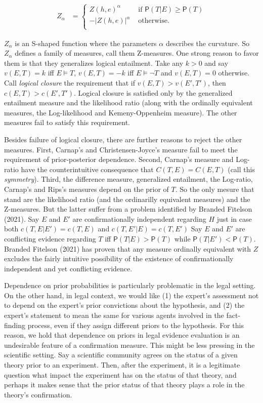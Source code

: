 \documentclass[
  10pt,
  dvipsnames,enabledeprecatedfontcommands]{scrartcl}
\newcommand{\n}{\neg}
\newcommand{\pr}[1]{\mathsf{P}(#1)}
\begin{document}
\begin{align*}
Z_{\alpha}  & =  \left\{ \begin{array}{lr} 
Z(h, e)^{\alpha} & \mbox{ if } \pr{T\vert E} \geq \pr{T}\\
- |Z(h, e)|^{\alpha} &\mbox { otherwise.}\\
\end{array} \right.
\end{align*}

\noindent \(Z_{\alpha}\) is an S-shaped function where the parameters
\(\alpha\) describes the curvature. So \(Z_{\alpha}\) defines a family
of measures, call them Z-measures. One strong reason to favor them is
that they generalizes logical entailment. Take any \(k > 0\) and say
\(v(E,T) =k\) iff \(E\models T\), \(v(E,T) = -k\) iff \(E \models \n T\)
and \(v(E,T)=0\) otherwise. Call \emph{logical closure} the requirement
that if \(v(E,T) > v(E', T')\), then \(c(E, T) > c(E' , T' )\). Logical
closure is satisfied only by the generalized entailment measure and the
likelihood ratio (along with the ordinally equivalent measures, the
Log-likelihood and Kemeny-Oppenheim measure). The other measures fail to
satisfy this requirement.

Besides failure of logical closure, there are further reasons to reject
the other measures. First, Carnap's and Christensen-Joyce's measure fail
to meet the requirement of prior-posterior dependence. Second, Carnap's
measure and Log-ratio have the counterintuitive consequence that
\(C(T,E)= C(E,T)\) (call this \emph{symmetry}). Third, the difference
measure, generalized entailment, the Log-ratio, Carnap's and Rips's
measures depend on the prior of \(T\). So the only mesure that stand are
the likelihood ratio (and the ordinarilly equivalent measures) and the
Z-measures. But the latter suffer from a problem identified by Branded
Fitelson (2021). Say \(E\) and \(E'\) are confirmationally independent
regarding \(H\) just in case both \(c(T, E \vert E' ) = c(T, E )\) and
\(c(T, E' \vert E ) = c(T, E')\) Say \(E\) and \(E'\) are conflicting
evidence regarding \(T\) iff \(\pr{T\vert E}> \pr{T}\) while
\(\pr{T\vert E'} < \pr{T}\). Branded Fitelson (2021) has proven that any
measure ordinally equivalent with \(Z\) excludes the fairly intuitive
possibility of the existence of confirmationally independent and yet
conflicting evidence.

Dependence on prior probabilities is particularly problematic in the
legal setting. On the other hand, in legal context, we would like (1)
the expert's assessment not to depend on the expert's prior convictions
about the hypothesis, and (2) the expert's statement to mean the same
for various agents involved in the fact-finding process, even if they
assign different priors to the hypothesis. For this reason, we hold that
dependence on priors in legal evidence evaluation is an undesirable
feature of a confirmation measure. This might be less pressing in the
scientific setting. Say a scientific community agrees on the status of a
given theory prior to an experiment. Then, after the experiment, it is a
legitimate question what impact the experiment has on the status of that
theory, and perhaps it makes sense that the prior status of that theory
plays a role in the theory's confirmation.
\end{document}
